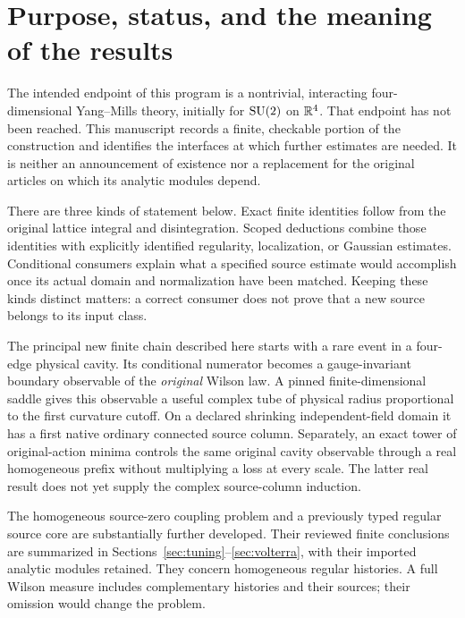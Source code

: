 \newcommand{\trn}{\operatorname{tr}}
\newcommand{\evref}[1]{\textup{[\textsf{#1}]}}
\newcommand{\norm}[1]{\left\lVert #1\right\rVert}

\section{Purpose, status, and the meaning of the results}

The intended endpoint of this program is a nontrivial, interacting four-dimensional Yang--Mills theory, initially for $\mathrm{SU}(2)$ on $\mathbb R^4$. That endpoint has not been reached. This manuscript records a finite, checkable portion of the construction and identifies the interfaces at which further estimates are needed. It is neither an announcement of existence nor a replacement for the original articles on which its analytic modules depend.

There are three kinds of statement below. Exact finite identities follow from the original lattice integral and disintegration. Scoped deductions combine those identities with explicitly identified regularity, localization, or Gaussian estimates. Conditional consumers explain what a specified source estimate would accomplish once its actual domain and normalization have been matched. Keeping these kinds distinct matters: a correct consumer does not prove that a new source belongs to its input class.

The principal new finite chain described here starts with a rare event in a four-edge physical cavity. Its conditional numerator becomes a gauge-invariant boundary observable of the \emph{original} Wilson law. A pinned finite-dimensional saddle gives this observable a useful complex tube of physical radius proportional to the first curvature cutoff. On a declared shrinking independent-field domain it has a first native ordinary connected source column. Separately, an exact tower of original-action minima controls the same original cavity observable through a real homogeneous prefix without multiplying a loss at every scale. The latter real result does not yet supply the complex source-column induction.

The homogeneous source-zero coupling problem and a previously typed regular source core are substantially further developed. Their reviewed finite conclusions are summarized in Sections~\ref{sec:tuning}--\ref{sec:volterra}, with their imported analytic modules retained. They concern homogeneous regular histories. A full Wilson measure includes complementary histories and their sources; their omission would change the problem.

